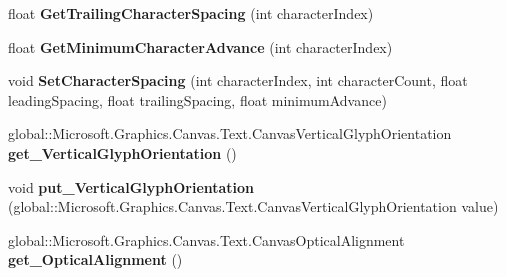 \begin{DoxyCompactItemize}
\mbox{\label{interface_microsoft_1_1_graphics_1_1_canvas_1_1_text_1_1_i_canvas_text_layout_a199bf5969708e06675546b0d7f97c609}} 
float {\bfseries Get\+Trailing\+Character\+Spacing} (int character\+Index)
\item 
\mbox{\label{interface_microsoft_1_1_graphics_1_1_canvas_1_1_text_1_1_i_canvas_text_layout_a9b50d894550f524f46294a3b5e626497}} 
float {\bfseries Get\+Minimum\+Character\+Advance} (int character\+Index)
\item 
\mbox{\label{interface_microsoft_1_1_graphics_1_1_canvas_1_1_text_1_1_i_canvas_text_layout_a4fe84383740a7e700a50355516d1638a}} 
void {\bfseries Set\+Character\+Spacing} (int character\+Index, int character\+Count, float leading\+Spacing, float trailing\+Spacing, float minimum\+Advance)
\item 
\mbox{\label{interface_microsoft_1_1_graphics_1_1_canvas_1_1_text_1_1_i_canvas_text_layout_a16ecbf654a23cfb935ad2339f832336b}} 
global\+::\+Microsoft.\+Graphics.\+Canvas.\+Text.\+Canvas\+Vertical\+Glyph\+Orientation {\bfseries get\+\_\+\+Vertical\+Glyph\+Orientation} ()
\item 
\mbox{\label{interface_microsoft_1_1_graphics_1_1_canvas_1_1_text_1_1_i_canvas_text_layout_a3745c348ddbf627ac42f367bde371029}} 
void {\bfseries put\+\_\+\+Vertical\+Glyph\+Orientation} (global\+::\+Microsoft.\+Graphics.\+Canvas.\+Text.\+Canvas\+Vertical\+Glyph\+Orientation value)
\item 
\mbox{\label{interface_microsoft_1_1_graphics_1_1_canvas_1_1_text_1_1_i_canvas_text_layout_a6f53ec2716648f680f6930ed036d8ee3}} 
global\+::\+Microsoft.\+Graphics.\+Canvas.\+Text.\+Canvas\+Optical\+Alignment {\bfseries get\+\_\+\+Optical\+Alignment} ()
\item 
\mbox{\label{interface_microsoft_1_1_graphics_1_1_canvas_1_1_text_1_1_i_canvas_text_layout_a766a153760270ab2c01c112374543791}} 

\end{DoxyCompactItemize}
